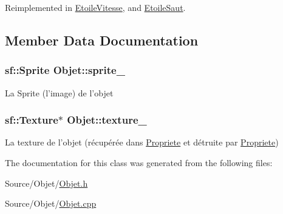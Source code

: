 Reimplemented in \hyperlink{classEtoileVitesse_adeaf3d5a8e3cffab1e022ad6bc41ca74}{Etoile\-Vitesse}, and \hyperlink{classEtoileSaut_af30f742b2e192981573121e77f98272a}{Etoile\-Saut}.



\subsection{Member Data Documentation}
\hypertarget{classObjet_a14d6ec296ba26ecd160e1035563b9770}{
\subsubsection[{sprite\-\_\-}]{\setlength{\rightskip}{0pt plus 5cm}sf\-::\-Sprite Objet\-::sprite\-\_\-\hspace{0.3cm}{\ttfamily [protected]}}}\label{classObjet_a14d6ec296ba26ecd160e1035563b9770}
La Sprite (l'image) de l'objet \hypertarget{classObjet_a5d76923ada7af8e557d72e66101c77d1}{
\subsubsection[{texture\-\_\-}]{\setlength{\rightskip}{0pt plus 5cm}sf\-::\-Texture$\ast$ Objet\-::texture\-\_\-\hspace{0.3cm}{\ttfamily [protected]}}}\label{classObjet_a5d76923ada7af8e557d72e66101c77d1}
La texture de l'objet (récupérée dans \hyperlink{namespacePropriete}{Propriete} et détruite par \hyperlink{namespacePropriete}{Propriete}) 

The documentation for this class was generated from the following files\-:\begin{DoxyCompactItemize}
\item 
Source/\-Objet/\hyperlink{Objet_8h}{Objet.\-h}\item 
Source/\-Objet/\hyperlink{Objet_2Objet_8cpp}{Objet.\-cpp}\end{DoxyCompactItemize}
